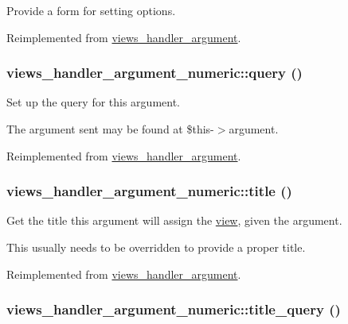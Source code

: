 Provide a form for setting options. 

Reimplemented from \hyperlink{classviews__handler__argument_44f015a0d527983ae6df2689f66b2c24}{views\_\-handler\_\-argument}.\hypertarget{classviews__handler__argument__numeric_399a3c37ef1277c6b79596fa6dd037a7}{
\subsubsection[{query}]{\setlength{\rightskip}{0pt plus 5cm}views\_\-handler\_\-argument\_\-numeric::query ()}}
\label{classviews__handler__argument__numeric_399a3c37ef1277c6b79596fa6dd037a7}


Set up the query for this argument.

The argument sent may be found at \$this-$>$argument. 

Reimplemented from \hyperlink{classviews__handler__argument_c4b0ce6704a10f515b2aea2f9e790994}{views\_\-handler\_\-argument}.\hypertarget{classviews__handler__argument__numeric_480758dbcde899b5483b091e51e2bf39}{
\subsubsection[{title}]{\setlength{\rightskip}{0pt plus 5cm}views\_\-handler\_\-argument\_\-numeric::title ()}}
\label{classviews__handler__argument__numeric_480758dbcde899b5483b091e51e2bf39}


Get the title this argument will assign the \hyperlink{classview}{view}, given the argument.

This usually needs to be overridden to provide a proper title. 

Reimplemented from \hyperlink{classviews__handler__argument_76181ac24e7be4a09aaafc1fa5f15ea1}{views\_\-handler\_\-argument}.\hypertarget{classviews__handler__argument__numeric_5c6f566b06bad6057e92f15d82311c7b}{
\subsubsection[{title\_\-query}]{\setlength{\rightskip}{0pt plus 5cm}views\_\-handler\_\-argument\_\-numeric::title\_\-query ()}}
\label{classviews__handler__argument__numeric_5c6f566b06bad6057e92f15d82311c7b}


